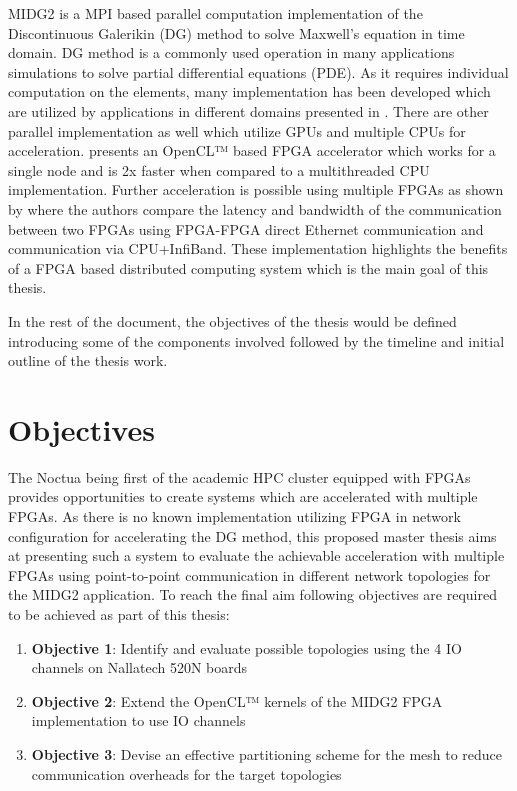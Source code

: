 \documentclass[english,notitlepage]{hgbreport}
\begin{document}
MIDG2 is a MPI based parallel computation implementation of the Discontinuous Galerikin (DG) \cite{hesthaven_nodal_2008} method
to solve Maxwell's equation in time domain. DG method is a commonly used operation in many applications simulations to solve
partial differential equations (PDE). As it requires individual computation on the elements, many implementation
has been developed which are utilized by applications in different domains presented in \cite{ye_discontinuous_2011, wilcox_high-order_2010,
collis_discontinuous_2002}. There are other parallel implementation as well which utilize GPUs \cite{afzal_solving_2018, klockner_nodal_2009}
and multiple CPUs \cite{baggag_parallel_1999} for acceleration. \textcite{kenter_opencl-based_2018} presents an OpenCL™ based
FPGA accelerator which works for a single node and is 2x faster when compared to a multithreaded CPU implementation. Further acceleration
is possible using multiple FPGAs as shown by \textcite{kobayashi_opencl-ready_2018} where the authors compare the latency and bandwidth
of the communication between two FPGAs using FPGA-FPGA direct Ethernet communication and communication via CPU+InfiBand.
These implementation highlights the benefits of a FPGA based distributed computing system which is the main goal of this thesis.

In the rest of the document, the objectives of the thesis would be defined introducing some of the components involved followed
by the timeline and initial outline of the thesis work.


\section{Objectives}

The Noctua being first of the academic HPC cluster equipped with FPGAs provides opportunities to 
create systems which are accelerated with multiple FPGAs. As there is no known implementation
utilizing FPGA in network configuration for accelerating the DG method, this proposed master thesis aims at presenting
such a system to evaluate the achievable acceleration with multiple FPGAs using point-to-point communication
in different network topologies for the MIDG2 application. To reach the final aim following objectives are
required to be achieved as part of this thesis:

\begin{enumerate}
	\item \textbf{Objective 1}: Identify and evaluate possible topologies using the 4 IO channels on Nallatech 520N boards
	\item \textbf{Objective 2}: Extend the OpenCL™ kernels of the MIDG2 FPGA implementation to use IO channels
	\item \textbf{Objective 3}: Devise an effective partitioning scheme for the mesh to reduce communication overheads for the target topologies
\end{enumerate}
\end{document}
